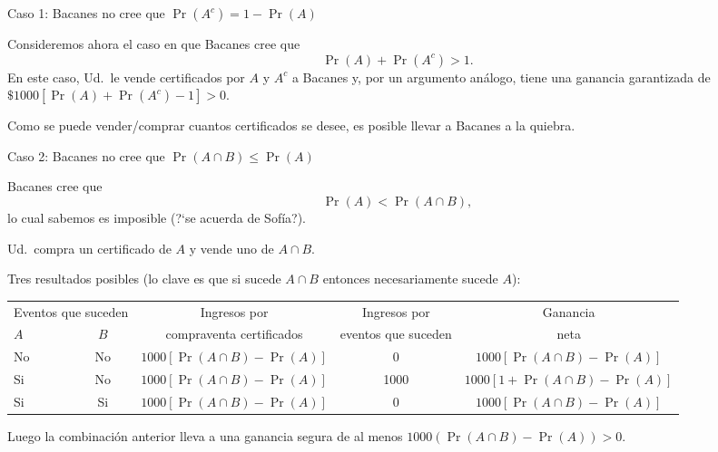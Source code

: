 \documentclass[9pt,handout]{beamer}
\begin{document}

\begin{frame}{Caso 1: Bacanes no cree que $\Pr(A^c)=1-\Pr(A)$}

Consideremos ahora el caso en que Bacanes cree que
\[
\Pr(A) + \Pr(A^c) > 1.
\]
En este caso, Ud.\ le vende certificados por $A$ y $A^c$ a Bacanes
y, por un argumento análogo, tiene una ganancia garantizada
de $\$1000[\Pr(A)+\Pr(A^c)-1]>0$. 

\bigskip

Como se puede vender/comprar cuantos certificados
se desee, es posible llevar a Bacanes a la quiebra. 
\end{frame}


\begin{frame}{Caso 2: Bacanes no cree que $\Pr(A\cap B)\leq\Pr(A)$}

Bacanes cree que 
\[
\Pr(A) < \Pr(A\cap B),
\]
lo cual sabemos es imposible (?`se acuerda de Sofía?). 

\bigskip

Ud.\ compra un certificado de $A$ y vende uno de $A\cap B$. 

\bigskip

Tres resultados posibles (lo clave es que si sucede
$A\cap B$ entonces necesariamente sucede $A$):

\begin{center}
\begin{tabular}{l cccc}
\toprule
\multicolumn{2}{c}{Eventos que suceden}  & Ingresos        por                      & Ingresos          por            & Ganancia         \\
$A$  & $B$                                       & compraventa certificados   & eventos que suceden  & neta      \\
\midrule
No    & No                                                   & $1000[\Pr(A\cap B)-\Pr(A)]$ & 0        & $1000[\Pr(A\cap B)-\Pr(A)]$\\
Si      & No                                                  & $1000[\Pr(A\cap B)-\Pr(A)]$ & 1000  & $1000[1+\Pr(A\cap B)-\Pr(A)]$\\
Si      & Si                                                    & $1000[\Pr(A\cap B)-\Pr(A)]$ & 0        & $1000[\Pr(A\cap B)-\Pr(A)]$\\
\bottomrule
\end{tabular}
\end{center}

\bigskip

Luego la combinación anterior lleva a una ganancia segura de al menos
$1000(\Pr(A\cap B)-\Pr(A))>0$.
\end{frame}
\end{document}
